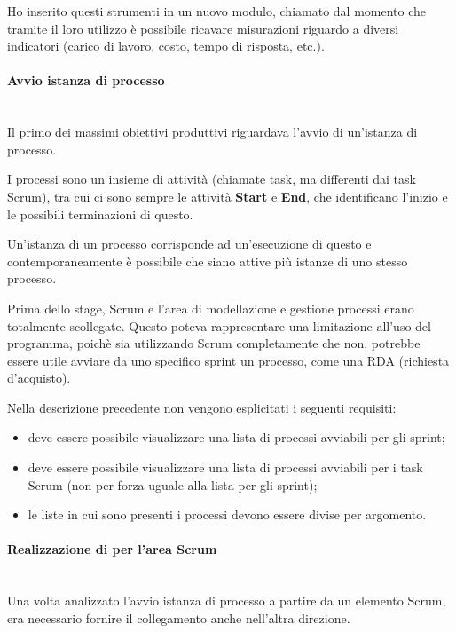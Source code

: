 Ho inserito questi strumenti in un nuovo modulo, chiamato 
dal momento che tramite il loro utilizzo è possibile ricavare misurazioni
riguardo a diversi indicatori (carico di lavoro, costo, tempo di risposta,
etc.).

\paragraph{Avvio istanza di processo} \mbox{} \\

Il primo dei massimi obiettivi produttivi riguardava l'avvio di un'istanza di
processo.

I processi sono un insieme di attività (chiamate task, ma differenti dai task
Scrum), tra cui ci sono sempre le attività \textbf{Start} e \textbf{End}, che
identificano l'inizio e le possibili terminazioni di questo.

Un'istanza di un processo corrisponde ad un'esecuzione di questo e
contemporaneamente è possibile che siano attive più istanze di uno stesso
processo.

Prima dello stage, Scrum e l'area di modellazione e gestione processi erano
totalmente scollegate. Questo poteva rappresentare una limitazione all'uso
del programma, poichè sia utilizzando Scrum completamente che non, potrebbe
essere utile avviare da uno specifico sprint un processo, come una RDA
(richiesta d'acquisto).

Nella descrizione precedente non vengono esplicitati i seguenti requisiti:

\begin{itemize}
\item deve essere possibile visualizzare una lista di processi avviabili per
  gli sprint;
\item deve essere possibile visualizzare una lista di processi avviabili per
  i task Scrum (non per forza uguale alla lista per gli sprint);
\item le liste in cui sono presenti i processi devono essere divise per
  argomento.
\end{itemize}

\paragraph{Realizzazione di  per l'area Scrum} \mbox{} \\

Una volta analizzato l'avvio istanza di processo a partire da un elemento
Scrum, era necessario fornire il collegamento anche nell'altra direzione.

